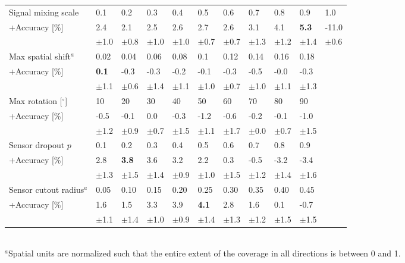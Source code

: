 \documentclass{article}
\newcommand{\std}[1]{{\scriptsize{$\pm$#1}}}
\begin{document}
\begin{table}
\begin{tabular}{l|llllllllll}
    \midrule
Signal mixing scale
    & 0.1 & 0.2 & 0.3 & 0.4 & 0.5 & 0.6 & 0.7 & 0.8 & 0.9 & 1.0 \\
    \hspace{5pt}+Accuracy [\%]
    & 2.4 & 2.1 & 2.5 & 2.6 & 2.7 & 2.6 & 3.1 & 4.1 & \textbf{5.3} & -11.0 \\
    & \std{1.0} & \std{0.8} & \std{1.0} & \std{1.0} & \std{0.7} & \std{0.7} & \std{1.3} & \std{1.2} & \std{1.4} & \std{0.6} \\
    \midrule

Max spatial shift$^a$
    & 0.02 & 0.04 & 0.06 & 0.08 & 0.1 & 0.12 & 0.14 & 0.16 & 0.18 \\
    \hspace{5pt}+Accuracy [\%]
    & \textbf{0.1} & -0.3 & -0.3 & -0.2 & -0.1 & -0.3 & -0.5 & -0.0 & -0.3 \\
    & \std{1.1} & \std{0.6} & \std{1.4} & \std{1.1} & \std{1.0} & \std{0.7} & \std{1.0} & \std{1.1} & \std{1.3} \\
    \midrule

Max rotation [$^\circ$]
    & 10 & 20 & 30 & 40 & 50 & 60 & 70 & 80 & 90 \\
    \hspace{5pt}+Accuracy [\%]
    & -0.5 & -0.1 & 0.0 & -0.3 & -1.2 & -0.6 & -0.2 & -0.1 & -1.0 \\
    & \std{1.2} & \std{0.9} & \std{0.7} & \std{1.5} & \std{1.1} & \std{1.7} & \std{0.0} & \std{0.7} & \std{1.5} \\
    \midrule

Sensor dropout $p$
    & 0.1 & 0.2 & 0.3 & 0.4 & 0.5 & 0.6 & 0.7 & 0.8 & 0.9 \\
    \hspace{5pt}+Accuracy [\%]
    & 2.8 & \textbf{3.8} & 3.6 & 3.2 & 2.2 & 0.3 & -0.5 & -3.2 & -3.4 \\
    & \std{1.3} & \std{1.5} & \std{1.4} & \std{0.9} & \std{1.0} & \std{1.5} & \std{1.2} & \std{1.4} & \std{1.6} \\
    \midrule

Sensor cutout radius$^a$
    & 0.05 & 0.10 & 0.15 & 0.20 & 0.25 & 0.30 & 0.35 & 0.40 & 0.45 \\
    \hspace{5pt}+Accuracy [\%]
    & 1.6 & 1.5 & 3.3 & 3.9 & \textbf{4.1} & 2.8 & 1.6 & 0.1 & -0.7 \\
    & \std{1.1} & \std{1.4} & \std{1.0} & \std{0.9} & \std{1.4} & \std{1.3} & \std{1.2} & \std{1.5} & \std{1.5} \\
    \bottomrule
  \end{tabular}\\
  \footnotesize{$^a$Spatial units are normalized such that the entire extent of the coverage in all directions is between 0 and 1.}
\end{table} 
\end{document}
